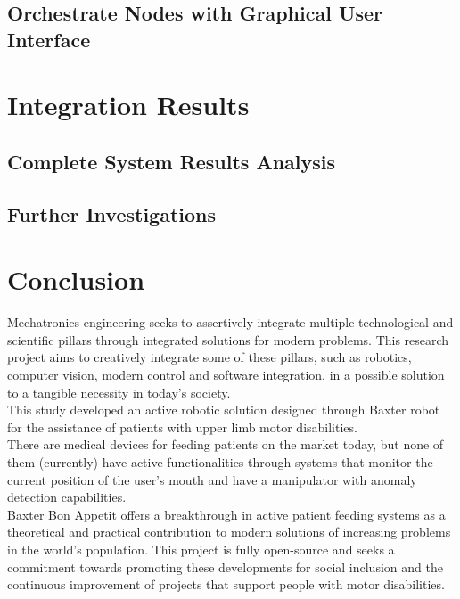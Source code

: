 \documentclass[11pt]{report} %
\begin{document}
\section{Orchestrate Nodes with Graphical User Interface}

\chapter{Integration Results}

\section{Complete System Results Analysis}

\section{Further Investigations}

\chapter{Conclusion}

Mechatronics engineering seeks to assertively integrate multiple technological and scientific pillars through integrated solutions for modern problems. This research project aims to creatively integrate some of these pillars, such as robotics, computer vision, modern control and software integration, in a possible solution to a tangible necessity in today's society.\\

This study developed an active robotic solution designed through Baxter robot for the assistance of patients with upper limb motor disabilities.\\

There are medical devices for feeding patients on the market today, but none of them (currently) have active functionalities through systems that monitor the current position of the user's mouth and have a manipulator with anomaly detection capabilities.\\

Baxter Bon Appetit offers a breakthrough in active patient feeding systems as a theoretical and practical contribution to modern solutions of increasing problems in the world's population. This project is fully open-source and seeks a commitment towards promoting these developments for social inclusion and the continuous improvement of projects that support people with motor disabilities.\\
\end{document}

